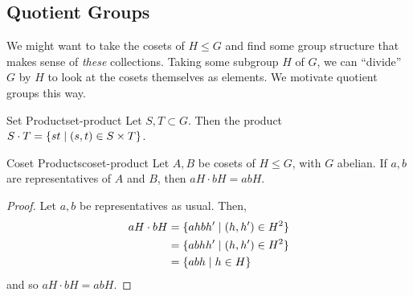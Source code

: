 \documentclass{article}
\begin{document}
\subsection{Quotient Groups}

We might want to take the cosets of $H \le G$ and find some group structure that makes sense of \emph{these} collections.
Taking some subgroup $H$ of $G$, we can ``divide'' $G$ by $H$ to look at the cosets themselves as elements.
We motivate quotient groups this way.

\begin{definition}{Set Product}{set-product}
  Let $S, T \subset G$. Then the product $S \cdot T = \lbrace st \mid (s, t) \in S \times T \rbrace$.
\end{definition}

\begin{proposition}{Coset Products}{coset-product}
  Let $A, B$ be cosets of $H \le G$, with $G$ abelian.
  If $a, b$ are representatives of $A$ and $B$, then $aH \cdot bH = abH$.
\end{proposition}
\begin{proof}
  Let $a, b$ be representatives as usual.
  Then,
  \begin{align*}
    aH \cdot bH &= \lbrace ah bh' \mid (h, h') \in H^{2} \rbrace\\
    &= \lbrace ab hh' \mid (h, h') \in H^{2} \rbrace\\
    &= \lbrace ab h \mid h \in H \rbrace
  \end{align*}
  and so $aH \cdot bH = abH$.
\end{proof}
\end{document}
